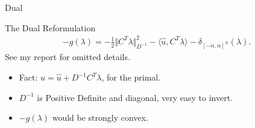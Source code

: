 \documentclass[11pt]{beamer}
\theoremstyle{definition}
\begin{document}
    \begin{frame}{Dual}
        \begin{block}{The Dual Reformulation}
            \begin{align*}
                - g(\lambda) = -\frac{1}{2}    \Vert C^T\lambda\Vert^2_{D^{-1}} - 
                \langle \hat u, C^T \lambda\rangle - 
                \delta_{[-\alpha, \alpha]^N}(\lambda). 
            \end{align*}
            See my report for omitted details.    
        \end{block}
        \begin{itemize}
            \item Fact: $u = \hat u + D^{-1}C^T\lambda$, for the primal. 
            \item $D^{-1}$ is Positive Definite and diagonal, very easy to invert. 
            \item $-g(\lambda)$ would be strongly convex. 
        \end{itemize}
    \end{frame}
\end{document}
